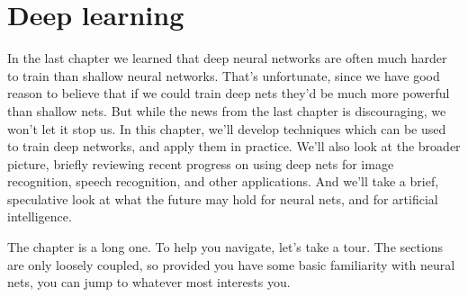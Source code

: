 \documentclass[a4paper,twoside,10pt]{book}
\begin{document}
\chapter{Deep learning}
In the last chapter we learned that deep neural networks are often much harder to train than shallow neural networks. That's unfortunate, since we have good reason to believe that if we could train deep nets they'd be much more powerful than shallow nets. But while the news from the last chapter is discouraging, we won't let it stop us. In this chapter, we'll develop techniques which can be used to train deep networks, and apply them in practice. We'll also look at the broader picture, briefly reviewing recent progress on using deep nets for image recognition, speech recognition, and other applications. And we'll take a brief, speculative look at what the future may hold for neural nets, and for artificial intelligence.

The chapter is a long one. To help you navigate, let's take a tour. The sections are only loosely coupled, so provided you have some basic familiarity with neural nets, you can jump to whatever most interests you.
\end{document}

